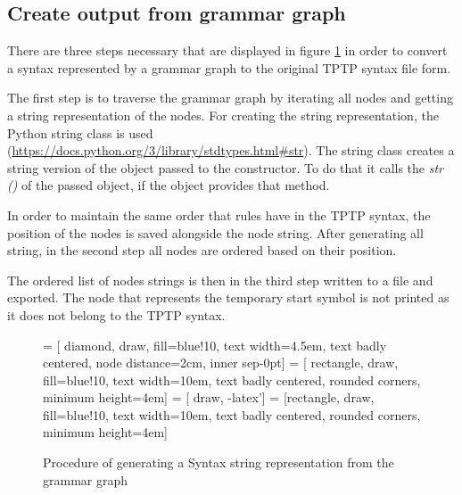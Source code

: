 \subsection{Create output from grammar graph}\label{sec:ConceptOutputGrammarGraph}
There are three steps necessary that are displayed in figure \ref{fig:ConceptOutputGrammarGraphProcedure} in order to convert a syntax represented by a grammar graph to the original \ac{TPTP} syntax file form.

The first step is to traverse the grammar graph by iterating all nodes and getting a string representation of the nodes.
For creating the string representation, the Python string class is used (\url{https://docs.python.org/3/library/stdtypes.html#str}). The string class creates a string version of the object passed to the constructor.
To do that it calls the \textit{\textunderscore \textunderscore str \textunderscore \textunderscore ()} of the passed object, if the object provides that method.

In order to maintain the same order that rules have in the \ac{TPTP} syntax, the position of the nodes is saved alongside the node string. 
After generating all string, in the second step all nodes are ordered based on their position. 

The ordered list of nodes strings is then in the third step written to a file and exported.
The node that represents the temporary start symbol is not printed as it does not belong to the \ac{TPTP} syntax. 

 
\begin{figure}[H]
 = [ diamond, draw, fill=blue!10, text width=4.5em, text badly centered, node distance=2cm, inner sep-0pt]  
 = [ rectangle, draw, fill=blue!10, text width=10em, text badly centered, rounded corners, minimum height=4em]  
 = [ draw, -latex']  
 = [rectangle, draw, fill=blue!10, text width=10em, text badly centered, rounded corners, minimum height=4em]  
\begin{center}
\end{center}
\caption{Procedure of generating a Syntax string representation from the grammar graph}
\label{fig:ConceptOutputGrammarGraphProcedure}
\end{figure}

